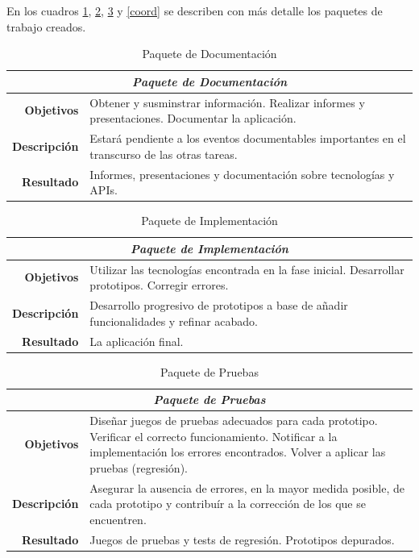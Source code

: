 \documentclass[a4paper,12pt,titlepage]{article}
\begin{document}
En los cuadros \ref{docu}, \ref{imple}, \ref{prue} y \ref{coord} se describen
con más detalle los paquetes de trabajo creados.

\begin{table}[h!]
\begin{tabular}{|r|p{}|}
\hline
\multicolumn{2}{|c|}{\emph{Paquete de Documentación}} \\
\hline
\hline

\textbf{Objetivos} &
Obtener y susminstrar información. Realizar informes y presentaciones.
Documentar la aplicación. \\
\hline
\textbf{Descripción} &
Estará pendiente a los eventos documentables importantes en el transcurso de
las otras tareas. \\
\hline
\textbf{Resultado} &
Informes, presentaciones y documentación sobre tecnologías y APIs. \\
\hline
\end{tabular}
\caption{Paquete de Documentación}\label{docu}
\end{table}

\begin{table}[h!]
\begin{tabular}{|r|p{}|}
\hline
\multicolumn{2}{|c|}{\emph{Paquete de Implementación}} \\
\hline
\hline

\textbf{Objetivos} &
Utilizar las tecnologías encontrada en la fase inicial. Desarrollar
prototipos. Corregir errores. \\
\hline
\textbf{Descripción} &
Desarrollo progresivo de prototipos a base de añadir funcionalidades y refinar
acabado. \\
\hline
\textbf{Resultado} &
La aplicación final. \\
\hline
\end{tabular}
\caption{Paquete de Implementación}\label{imple}
\end{table}

\begin{table}[h!]
\begin{tabular}{|r|p{}|}
\hline
\multicolumn{2}{|c|}{\emph{Paquete de Pruebas}} \\
\hline
\hline

\textbf{Objetivos} &
Diseñar juegos de pruebas adecuados para cada prototipo. Verificar el correcto
funcionamiento. Notificar a la implementación los errores encontrados. Volver
a aplicar las pruebas (regresión). \\
\hline
\textbf{Descripción} &
Asegurar la ausencia de errores, en la mayor medida posible, de cada prototipo
y contribuír a la corrección de los que se encuentren. \\
\hline
\textbf{Resultado} &
Juegos de pruebas y tests de regresión. Prototipos depurados. \\
\hline
\end{tabular}
\caption{Paquete de Pruebas}\label{prue}
\end{table}
\end{document}
